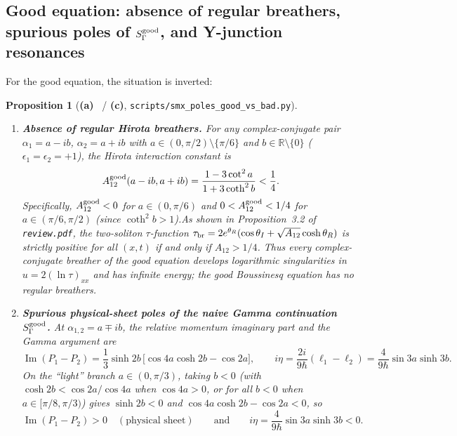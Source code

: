 \documentclass[11pt,a4paper]{article}
\newcommand{\La}{\textsf{\textbf{(a)}}}
\newcommand{\Lc}{\textsf{\textbf{(c)}}}
\newcommand{\script}[1]{\texttt{scripts/\allowbreak #1}}
\newtheorem{proposition}{Proposition}[section]
\theoremstyle{remark}
\begin{document}
\subsection{Good equation: absence of regular breathers, spurious poles of \texorpdfstring{$S_\Gamma^{\rm good}$}{S\_Gamma\^{}good}, and Y-junction resonances}
For the good equation, the situation is inverted:

\begin{proposition}[\La~\cite{LMK,BD} / \Lc, \script{smx\_poles\_good\_vs\_bad.py}]\label{prop:good_poles}
\begin{enumerate}
\item \textbf{Absence of regular Hirota breathers.}
For any complex-conjugate pair $\alpha_1=a-ib$, $\alpha_2=a+ib$ with $a\in(0,\pi/2)\setminus\{\pi/6\}$ and $b\in\mathbb R\setminus\{0\}$ ($\epsilon_1=\epsilon_2=+1$), the Hirota interaction constant is
\begin{equation}\label{eq:A_good_br}
A_{12}^{\rm good}(a-ib,a+ib)=\frac{1-3\cot^2 a}{1+3\coth^2 b}<\frac14.
\end{equation}
Specifically, $A_{12}^{\rm good}<0$ for $a\in(0,\pi/6)$ and $0<A_{12}^{\rm good}<1/4$ for $a\in(\pi/6,\pi/2)$ (since $\coth^2 b>1$).As shown in Proposition~3.2 of \texttt{review.pdf}, the two-soliton $\tau$-function $\tau_{\rm br}=2e^{\theta_R}(\cos\theta_I+\sqrt{A_{12}}\cosh\theta_R)$ is strictly positive for all $(x,t)$ if and only if $A_{12}>1/4$. Thus \emph{every} complex-conjugate breather of the good equation develops logarithmic singularities in $u=2(\ln\tau)_{xx}$ and has infinite energy; the good Boussinesq equation has no regular breathers.
\item \textbf{Spurious physical-sheet poles of the naive Gamma continuation $S_\Gamma^{\rm good}$.}
At $\alpha_{1,2}=a\mp ib$, the relative momentum imaginary part and the Gamma argument are
\begin{equation}\label{eq:good_ImP_ieta}
\operatorname{Im}(P_1-P_2)=\frac13\sinh 2b\,\bigl[\cos 4a\cosh 2b-\cos 2a\bigr],\qquad
i\eta=\frac{2i}{9\hbar}(\ell_1-\ell_2)=\frac{4}{9\hbar}\sin 3a\sinh 3b.
\end{equation}
On the ``light'' branch $a\in(0,\pi/3)$, taking $b<0$ (with $\cosh 2b<\cos 2a/\cos 4a$ when $\cos 4a>0$, or for all $b<0$ when $a\in[\pi/8,\pi/3)$) gives $\sinh 2b<0$ and $\cos 4a\cosh 2b-\cos 2a<0$, so
\begin{equation}\label{eq:spurious_pole_cond}
\operatorname{Im}(P_1-P_2)>0\quad(\text{physical sheet})\qquad\text{and}\qquad i\eta=\frac{4}{9\hbar}\sin 3a\sinh 3b<0.

\end{equation}
\end{enumerate}
\end{proposition}
\end{document}
